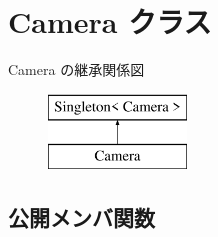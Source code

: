 \hypertarget{class_camera}{}\section{Camera クラス}
\label{class_camera}
Camera の継承関係図\begin{figure}[H]
\begin{center}
\leavevmode
\includegraphics[height=2.000000cm]{class_camera}
\end{center}
\end{figure}
\subsection*{公開メンバ関数}
